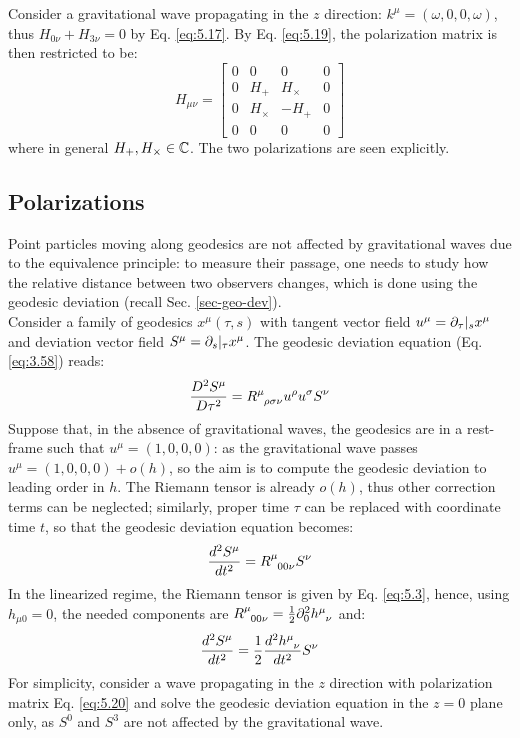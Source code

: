 \begin{example}
  Consider a gravitational wave propagating in the $ z $ direction: $ k^\mu = (\omega,0,0,\omega) $, thus $ H_{0 \nu} + H_{3 \nu} = 0 $ by Eq. \ref{eq:5.17}. By Eq. \ref{eq:5.19}, the polarization matrix is then restricted to be:
  \begin{equation}
    H_{\mu \nu} =
    \begin{bmatrix}
      0 & 0 & 0 & 0 \\
      0 & H_+ & H_\times & 0 \\
      0 & H_\times & -H_+ & 0 \\
      0 & 0 & 0 & 0
    \end{bmatrix}
    \label{eq:5.20}
  \end{equation}
  where in general $ H_+, H_\times \in \mathbb{C} $. The two polarizations are seen explicitly.
\end{example}

\subsection{Polarizations}

Point particles moving along geodesics are not affected by gravitational waves due to the equivalence principle: to measure their passage, one needs to study how the relative distance between two observers changes, which is done using the geodesic deviation (recall Sec. \ref{sec-geo-dev}).\\
Consider a family of geodesics $ x^\mu(\tau,s) $ with tangent vector field $ u^\mu = \partial_\tau \vert_s x^\mu $ and deviation vector field $ S^\mu = \partial_s \vert_\tau x^\mu $. The geodesic deviation equation (Eq. \ref{eq:3.58}) reads:
\begin{equation*}
  \frac{D^2 S^\mu}{D \tau^2} = \tensor{R}{^\mu_{\rho \sigma \nu}} u^\rho u^\sigma S^\nu
\end{equation*}
Suppose that, in the absence of gravitational waves, the geodesics are in a rest-frame such that $ u^\mu = (1,0,0,0) $: as the gravitational wave passes $ u^\mu = (1,0,0,0) + o(h) $, so the aim is to compute the geodesic deviation to leading order in $ h $. The Riemann tensor is already $ o(h) $, thus other correction terms can be neglected; similarly, proper time $ \tau $ can be replaced with coordinate time $ t $, so that the geodesic deviation equation becomes:
\begin{equation*}
  \frac{d^2 S^\mu}{dt^2} = \tensor{R}{^\mu_{00 \nu}} S^\nu
\end{equation*}
In the linearized regime, the Riemann tensor is given by Eq. \ref{eq:5.3}, hence, using $ h_{\mu 0} = 0 $, the needed components are $ \tensor{R}{^\mu_{00 \nu}} = \frac{1}{2} \pa_0^2 \tensor{h}{^\mu_\nu} $ and:
\begin{equation}
  \frac{d^2 S^\mu}{dt^2} = \frac{1}{2} \frac{d^2 \tensor{h}{^\mu_\nu}}{dt^2} S^\nu
  \label{eq:5.21}
\end{equation}
For simplicity, consider a wave propagating in the $ z $ direction with polarization matrix Eq. \ref{eq:5.20} and solve the geodesic deviation equation in the $ z = 0 $ plane only, as $ S^0 $ and $ S^3 $ are not affected by the gravitational wave.

